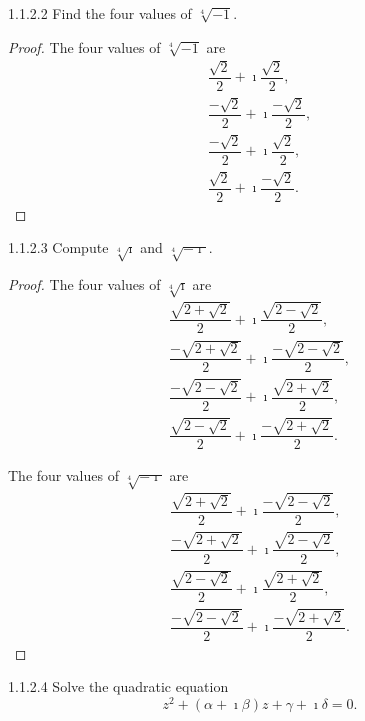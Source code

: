 \begin{problem}{1.1.2.2}
Find the four values of \( \sqrt[4]{-1} \).
\end{problem}

\begin{proof}
	The four values of \( \sqrt[4]{-1} \) are
	\begingroup
	\allowdisplaybreaks%
	\begin{align*}
		\dfrac{\sqrt{2}}{2} + \imath\dfrac{\sqrt{2}}{2},   \\
		\dfrac{-\sqrt{2}}{2} + \imath\dfrac{-\sqrt{2}}{2}, \\
		\dfrac{-\sqrt{2}}{2} + \imath\dfrac{\sqrt{2}}{2},  \\
		\dfrac{\sqrt{2}}{2} + \imath\dfrac{-\sqrt{2}}{2}.
	\end{align*}
	\endgroup
\end{proof}

\begin{problem}{1.1.2.3}
Compute \( \sqrt[4]{\imath} \) and \( \sqrt[4]{-\imath} \).
\end{problem}

\begin{proof}
	The four values of \( \sqrt[4]{\imath} \) are
	\begingroup
	\allowdisplaybreaks%
	\begin{align*}
		\dfrac{\sqrt{2 + \sqrt{2}}}{2} + \imath\dfrac{\sqrt{2 - \sqrt{2}}}{2},   \\
		\dfrac{-\sqrt{2 + \sqrt{2}}}{2} + \imath\dfrac{-\sqrt{2 - \sqrt{2}}}{2}, \\
		\dfrac{-\sqrt{2 - \sqrt{2}}}{2} + \imath\dfrac{\sqrt{2 + \sqrt{2}}}{2},  \\
		\dfrac{\sqrt{2 - \sqrt{2}}}{2} + \imath\dfrac{-\sqrt{2 + \sqrt{2}}}{2}.
	\end{align*}
	\endgroup

	The four values of \( \sqrt[4]{-\imath} \) are
	\begingroup
	\allowdisplaybreaks%
	\begin{align*}
		\dfrac{\sqrt{2 + \sqrt{2}}}{2} + \imath\dfrac{-\sqrt{2 - \sqrt{2}}}{2}, \\
		\dfrac{-\sqrt{2 + \sqrt{2}}}{2} + \imath\dfrac{\sqrt{2 - \sqrt{2}}}{2}, \\
		\dfrac{\sqrt{2 - \sqrt{2}}}{2} + \imath\dfrac{\sqrt{2 + \sqrt{2}}}{2},  \\
		\dfrac{-\sqrt{2 - \sqrt{2}}}{2} + \imath\dfrac{-\sqrt{2 + \sqrt{2}}}{2}.
	\end{align*}
	\endgroup
\end{proof}

\begin{problem}{1.1.2.4}
Solve the quadratic equation
\[
	z^{2} + (\alpha + \imath\beta) z + \gamma + \imath\delta = 0.
\]
\end{problem}

